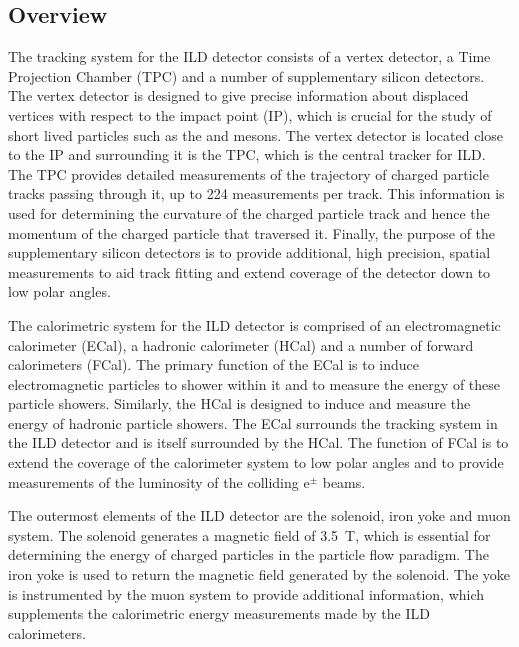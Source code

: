 
\subsection{Overview}
The tracking system for the ILD detector consists of a vertex detector, a Time Projection Chamber (TPC) and a number of supplementary silicon detectors.  The vertex detector is designed to give precise information about displaced vertices with respect to the impact point (IP), which is crucial for the study of short lived particles such as the \PD and \PB mesons.  The vertex detector is located close to the IP and surrounding it is the TPC, which is the central tracker for ILD.  The TPC provides detailed measurements of the trajectory of charged particle tracks passing through it, up to 224 measurements per track.  This information is used for determining the curvature of the charged particle track and hence the momentum of the charged particle that traversed it.  Finally, the purpose of the supplementary silicon detectors is to provide additional, high precision, spatial measurements to aid track fitting and extend coverage of the detector down to low polar angles.  

The calorimetric system for the ILD detector is comprised of an electromagnetic calorimeter (ECal), a hadronic calorimeter (HCal) and a number of forward calorimeters (FCal).  The primary function of the ECal is to induce electromagnetic particles to shower within it and to measure the energy of these particle showers.  Similarly, the HCal is designed to induce and measure the energy of hadronic particle showers.  The ECal surrounds the tracking system in the ILD detector and is itself surrounded by the HCal.  The function of FCal is to extend the coverage of the calorimeter system to low polar angles and to provide measurements of the luminosity of the colliding $\text{e}^{\pm}$ beams.  

The outermost elements of the ILD detector are the solenoid, iron yoke and muon system.  The solenoid generates a magnetic field of 3.5~T, which is essential for determining the energy of charged particles in the particle flow paradigm.  The iron yoke is used to return the magnetic field generated by the solenoid.  The yoke is instrumented by the muon system to provide additional information, which supplements the calorimetric energy measurements made by the ILD calorimeters.  

